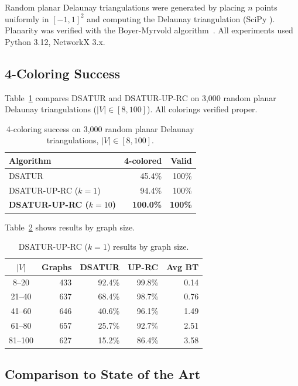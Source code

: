 \documentclass[11pt,twocolumn]{article}
\begin{document}
Random planar Delaunay triangulations were generated by placing $n$ points
uniformly in $[-1,1]^2$ and computing the Delaunay triangulation (SciPy
\cite{scipy}).  Planarity was verified with the Boyer-Myrvold
algorithm~\cite{nx}.  All experiments used Python 3.12, NetworkX 3.x.

\subsection{4-Coloring Success}

Table~\ref{tab:main} compares DSATUR and DSATUR-UP-RC on 3{,}000 random
planar Delaunay triangulations ($|V|\in[8,100]$).  All colorings verified
proper.

\begin{table}[t]
\caption{4-coloring success on 3{,}000 random planar Delaunay
triangulations, $|V|\in[8,100]$.}
\label{tab:main}
\centering\small
\begin{tabular}{p{3.5cm}rr}
\toprule
\textbf{Algorithm} & \textbf{4-colored} & \textbf{Valid} \\
\midrule
DSATUR~\cite{brelaz1979}       & 45.4\% & 100\% \\
DSATUR-UP-RC ($k=1$)           & 94.4\% & 100\% \\
\textbf{DSATUR-UP-RC ($k=10$)} & \textbf{100.0\%} & \textbf{100\%} \\
\bottomrule
\end{tabular}
\end{table}

Table~\ref{tab:bysize} shows results by graph size.

\begin{table}[t]
\caption{DSATUR-UP-RC ($k=1$) results by graph size.}
\label{tab:bysize}
\centering\scriptsize
\begin{tabular}{crrrr}
\toprule
$|V|$ & Graphs & DSATUR & UP-RC & Avg BT \\
\midrule
8--20   & 433  & 92.4\% & 99.8\% & 0.14 \\
21--40  & 637  & 68.4\% & 98.7\% & 0.76 \\
41--60  & 646  & 40.6\% & 96.1\% & 1.49 \\
61--80  & 657  & 25.7\% & 92.7\% & 2.51 \\
81--100 & 627  & 15.2\% & 86.4\% & 3.58 \\
\bottomrule
\end{tabular}
\end{table}

\subsection{Comparison to State of the Art}
\end{document}
